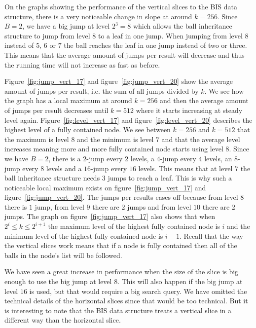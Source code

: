 On the graphs showing the performance of the vertical slices to the BIS data structure, there is a very noticeable change in slope at around $k=256$. Since $B=2$, we have a big jump at level $2^3 = 8$ which allows the ball inheritance structure to jump from level $8$ to a leaf in one jump. When jumping from level $8$ instead of $5$, $6$ or $7$ the ball reaches the leaf in one jump instead of two or three. This means that the average amount of jumps per result will decrease and thus the running time will not increase as fast as before.

Figure~\ref{fig:jump_vert_17} and figure~\ref{fig:jump_vert_20} show the average amount of jumps per result, i.e. the sum of all jumps divided by $k$. We see how the graph has a local maximum at around $k=256$ and then the average amount of jumps per result decreases until $k=512$ where it starts increasing at steady level again. Figure~\ref{fig:level_vert_17} and figure~\ref{fig:level_vert_20} describes the highest level of a fully contained node. We see between $k=256$ and $k=512$ that the maximum is level $8$ and the minimum is level $7$ and that the average level increases meaning more and more fully contained node starts using level $8$. Since we have $B=2$, there is a $2$-jump every $2$ levels, a $4$-jump every $4$ levels, an $8$-jump every $8$ levels and a $16$-jump every $16$ levels. This means that at level $7$ the ball inheritance structure needs $3$ jumps to reach a leaf. This is why such a noticeable local maximum exists on figure~\ref{fig:jump_vert_17} and figure~\ref{fig:jump_vert_20}. The jumps per results eases off because from level $8$ there is $1$ jump, from level $9$ there are $2$ jumps and from level $10$ there are $2$ jumps. The graph on figure~\ref{fig:jump_vert_17} also shows that when $2^i \leq k \leq 2^{i+1}$ the maximum level of the highest fully contained node is $i$ and the minimum level of the highest fully contained node is $i-1$. Recall that the way the vertical slices work means that if a node is fully contained then all of the balls in the node's list will be followed.

We have seen a great increase in performance when the size of the slice is big enough to use the big jump at level $8$. This will also happen if the big jump at level $16$ is used, but that would require a big search query. We have omitted the technical details of the horizontal slices since that would be too technical. But it is interesting to note that the BIS data structure treats a vertical slice in a different way than the horizontal slice. 

